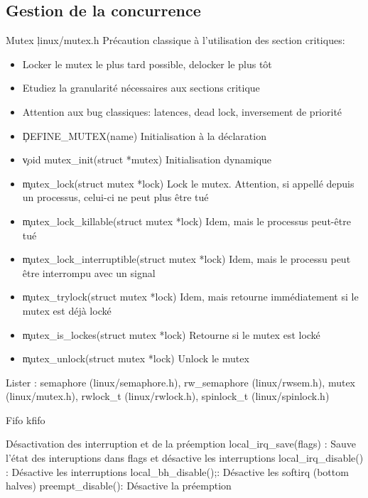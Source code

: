 \subsection{Gestion de la concurrence}
\begin{frame}{Mutex}
\c{linux/mutex.h}
Précaution classique à l'utilisation des section critiques:
\begin{itemize}
\item Locker le mutex le plus tard possible, delocker le plus tôt
\item Etudiez la granularité nécessaires aux sections critique
\item  Attention aux bug classiques: latences, dead lock, inversement de priorité
\end{itemize} 
\begin{itemize}
\item \c{DEFINE_MUTEX(name)} Initialisation à la déclaration
\item \c{void mutex_init(struct *mutex)} Initialisation dynamique
\item \c{mutex_lock(struct mutex *lock)} Lock le mutex. Attention, si appellé depuis un processus, celui-ci ne peut plus être tué
\item \c{mutex_lock_killable(struct mutex *lock)} Idem, mais le processus peut-être tué
\item \c{mutex_lock_interruptible(struct mutex *lock)} Idem, mais le processu peut être interrompu avec un signal
\item \c{mutex_trylock(struct mutex *lock)} Idem, mais retourne immédiatement si le mutex est déjà locké
\item \c{mutex_is_lockes(struct mutex *lock)} Retourne si le mutex est locké
\item \c{mutex_unlock(struct mutex *lock)} Unlock le mutex
\end{itemize}
Lister : semaphore (linux/semaphore.h),  rw_semaphore (linux/rwsem.h),  mutex (linux/mutex.h), rwlock_t (linux/rwlock.h), spinlock_t (linux/spinlock.h)

\begin{frame}{Fifo}
kfifo
\end{frame} 

\begin{frame}{Désactivation des interruption et de la préemption}
local_irq_save(flags) : Sauve l'état des interuptions dans flags et désactive les interruptions 
local_irq_disable() : Désactive les interruptions
local_bh_disable();: Désactive les softirq (bottom halves)
preempt_disable(): Désactive la préemption


\end{frame}
\end{frame}
